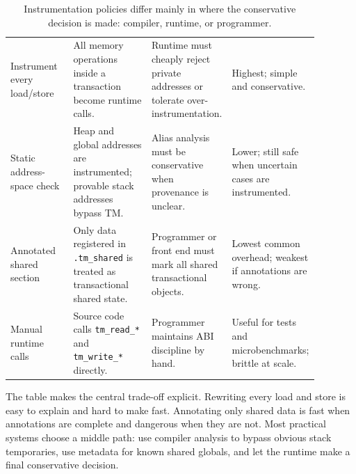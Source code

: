 \begin{table}[htbp]
\centering
\begin{tabular}{M{0.22\linewidth}M{0.28\linewidth}M{0.22\linewidth}M{0.16\linewidth}}
\hline
{} &  &  &  \\
\hline
Instrument every load/store & All memory operations inside a transaction become runtime calls. & Runtime must cheaply reject private addresses or tolerate over-instrumentation. & Highest; simple and conservative. \\
Static address-space check & Heap and global addresses are instrumented; provable stack addresses bypass TM. & Alias analysis must be conservative when provenance is unclear. & Lower; still safe when uncertain cases are instrumented. \\
Annotated shared section & Only data registered in \texttt{.tm\_shared} is treated as transactional shared state. & Programmer or front end must mark all shared transactional objects. & Lowest common overhead; weakest if annotations are wrong. \\
Manual runtime calls & Source code calls \texttt{tm\_read\_*} and \texttt{tm\_write\_*} directly. & Programmer maintains ABI discipline by hand. & Useful for tests and microbenchmarks; brittle at scale. \\
\hline
\end{tabular}
\caption{Instrumentation policies differ mainly in where the conservative decision is made: compiler, runtime, or programmer.}
\label{tab:instrumentation-policies}
\end{table}

The table makes the central trade-off explicit. Rewriting every load and store is easy to explain and hard to make fast. Annotating only shared data is fast when annotations are complete and dangerous when they are not. Most practical systems choose a middle path: use compiler analysis to bypass obvious stack temporaries, use metadata for known shared globals, and let the runtime make a final conservative decision.

